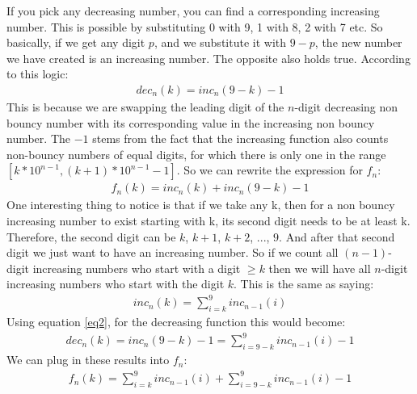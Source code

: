 \documentclass[titlepage,12pt]{article}
\begin{document}
If you pick any decreasing number, you can find a corresponding increasing number. This is possible by substituting 0 with 9, 1 with 8, 2 with 7 etc. So basically, if we get any digit $p$, and we substitute it with $9-p$, the new number we have created is an increasing number. The opposite also holds true. According to this logic:
\begin{equation} \label{eq2}
    \begin{split}
        dec_n(k)=inc_n(9-k)-1
    \end{split}
\end{equation}
This is because we are swapping the leading digit of the $n$-digit decreasing non bouncy number with its corresponding value in the increasing non bouncy number. The $-1$ stems from the fact that the increasing function also counts non-bouncy numbers of equal digits, for which there is only one in the range $[k*10^{n-1}, (k+1)*10^{n-1}-1]$. So we can rewrite the expression for $f_n$:
\begin{equation} \label{eq3}
    \begin{split}
        f_n(k) = inc_n(k) + inc_n(9-k) - 1
    \end{split}
\end{equation}
\noindent
One interesting thing to notice is that if we take any k, then for a non bouncy increasing number to exist starting with k, its second digit needs to be at least k. Therefore, the second digit can be $k$, $k+1$, $k+2$, ..., $9$. And after that second digit we just want to have an increasing number. So if we count all $(n-1)$-digit increasing numbers who start with a digit $\geq k$ then we will have all $n$-digit increasing numbers who start with the digit $k$. This is the same as saying:
\begin{equation} \label{eq4}
    \begin{split}
        inc_n(k) = \sum_{i=k}^{9} inc_{n-1}(i)
    \end{split}
\end{equation}
Using equation \ref{eq2}, for the decreasing function this would become:
\begin{equation} \label{eq5}
    \begin{split}
        dec_n(k) = inc_n(9-k) - 1 = \sum_{i=9-k}^{9} inc_{n-1}(i) - 1
    \end{split}
\end{equation}
We can plug in these results into $f_n$:
\begin{equation} \label{eq6}
    \begin{split}
        f_n(k) = \sum_{i=k}^{9} inc_{n-1}(i) + \sum_{i=9-k}^{9} inc_{n-1}(i) - 1
    \end{split}
\end{equation}
\end{document}
